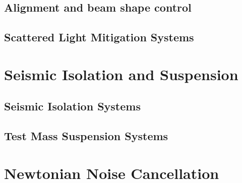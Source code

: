 \subsection{Alignment and beam shape control}

\subsection{Scattered Light Mitigation Systems}




\section{Seismic Isolation and Suspension}
\label{Sec:SASandSUS}

\subsection{Seismic Isolation Systems}
\label{Sec:SAS}


\subsection{Test Mass Suspension Systems}
\label{Sec:SUS}



%
%

\section {Newtonian Noise Cancellation}
\label{Sec:NewtonianNoise}
